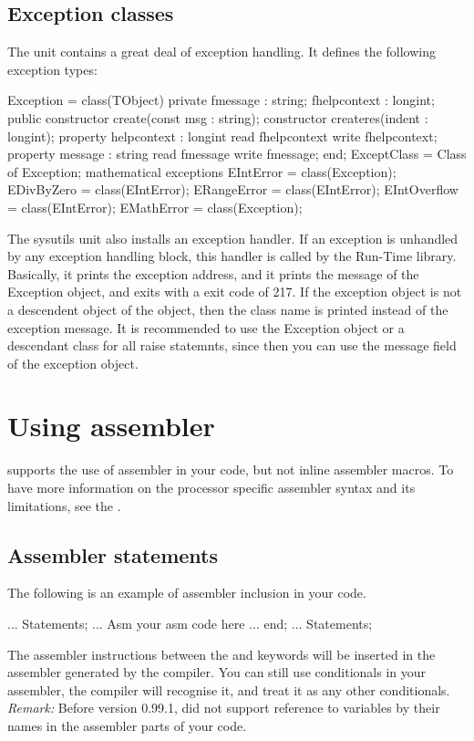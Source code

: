 \documentclass{report}
\begin{document}
\section{Exception classes}
\label{se:exceptclasses}
The  unit contains a great deal of exception handling.
It defines the following exception types:
\begin{listing}
       Exception = class(TObject)
        private
          fmessage : string;
          fhelpcontext : longint;
        public
          constructor create(const msg : string);
          constructor createres(indent : longint);
          property helpcontext : longint read fhelpcontext write fhelpcontext;
          property message : string read fmessage write fmessage;
       end;
       ExceptClass = Class of Exception;
       { mathematical exceptions }
       EIntError = class(Exception);
       EDivByZero = class(EIntError);
       ERangeError = class(EIntError);
       EIntOverflow = class(EIntError);
       EMathError = class(Exception);
\end{listing}
The sysutils unit also installs an exception handler. If an exception is
unhandled by any exception handling block, this handler is called by the
Run-Time library. Basically, it prints the exception address, and it prints 
the message of the Exception object, and exits with a exit code of 217.
If the exception object is not a descendent object of the 
object, then the class name is printed instead of the exception message.
It is recommended to use the Exception object or a descendant class for 
all raise statemnts, since then you can use the message field of the
exception object.
\chapter{Using assembler}
\fpc supports the use of assembler in your code, but not inline
assembler macros.  To have more information on the processor
specific assembler syntax and its limitations, see the \progref.
\section{Assembler statements }
The following is an example of assembler inclusion in your code.
\begin{listing}
 ...
 Statements;
 ...
 Asm
   your asm code here
   ...
 end;
 ...
 Statements;
\end{listing}
The assembler instructions between the  and  keywords will
be inserted in the assembler generated by the compiler.
You can still use conditionals in your assembler, the compiler will
recognise it, and treat it as any other conditionals.
\emph{ Remark: } Before version 0.99.1, \fpc did not support
reference to variables by their names in the assembler parts of your code.
\end{document}
